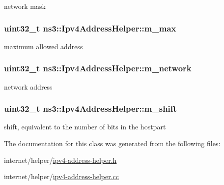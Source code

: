 network mask 

\subsubsection[{\texorpdfstring{m\+\_\+max}{m_max}}]{\setlength{\rightskip}{0pt plus 5cm}uint32\+\_\+t ns3\+::\+Ipv4\+Address\+Helper\+::m\+\_\+max\hspace{0.3cm}{\ttfamily [private]}}\hypertarget{classns3_1_1Ipv4AddressHelper_aa4a0386e78cf9fb6851ffeb47c4ae1db}{}\label{classns3_1_1Ipv4AddressHelper_aa4a0386e78cf9fb6851ffeb47c4ae1db}


maximum allowed address 

\subsubsection[{\texorpdfstring{m\+\_\+network}{m_network}}]{\setlength{\rightskip}{0pt plus 5cm}uint32\+\_\+t ns3\+::\+Ipv4\+Address\+Helper\+::m\+\_\+network\hspace{0.3cm}{\ttfamily [private]}}\hypertarget{classns3_1_1Ipv4AddressHelper_a33cf40b39d8e89b8ed3db1545371a147}{}\label{classns3_1_1Ipv4AddressHelper_a33cf40b39d8e89b8ed3db1545371a147}


network address 

\subsubsection[{\texorpdfstring{m\+\_\+shift}{m_shift}}]{\setlength{\rightskip}{0pt plus 5cm}uint32\+\_\+t ns3\+::\+Ipv4\+Address\+Helper\+::m\+\_\+shift\hspace{0.3cm}{\ttfamily [private]}}\hypertarget{classns3_1_1Ipv4AddressHelper_a007ffce20667e8a2187e4fa023589a45}{}\label{classns3_1_1Ipv4AddressHelper_a007ffce20667e8a2187e4fa023589a45}


shift, equivalent to the number of bits in the hostpart 



The documentation for this class was generated from the following files\+:\begin{DoxyCompactItemize}
\item 
internet/helper/\hyperlink{ipv4-address-helper_8h}{ipv4-\/address-\/helper.\+h}\item 
internet/helper/\hyperlink{ipv4-address-helper_8cc}{ipv4-\/address-\/helper.\+cc}\end{DoxyCompactItemize}
